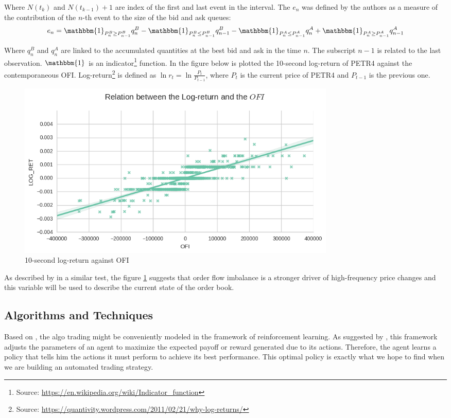\documentclass[a4paper]{article}
\begin{document}
Where $N(t_k)$ and $N(t_{k-1}) + 1$ are index of the first and last event in the interval. The $e_n$ was defined by the authors as a measure of the contribution of the $n$-th event to the size of the bid and ask queues:
$$e_n = \mathbbm{1}_{P_{n}^{B} \geq P_{n-1}^{B}} q^{B}_{n} - \mathbbm{1}_{P_{n}^{B} \leq P_{n-1}^{B}}  q^{B}_{n-1} - \mathbbm{1}_{P_{n}^{A} \leq P_{n-1}^{A}} q^{A}_{n} + \mathbbm{1}_{P_{n}^{A} \geq P_{n-1}^{A}}  q^{A}_{n-1}$$

Where $q^{B}_{n}$ and $q^{A}_{n}$ are linked to the accumulated quantities at the best bid and ask in the time $n$. The subscript $n-1$ is related to the last observation. $\mathbbm{1}$ is an indicator\footnote{Source: \url{https://en.wikipedia.org/wiki/Indicator_function}} function. In the figure below is plotted the 10-second log-return of PETR4 against the contemporaneous OFI.  Log-return\footnote{Source: \url{https://quantivity.wordpress.com/2011/02/21/why-log-returns/}} is defined as $\ln{r_t} = \ln{\frac{P_t}{P_{t-1}}}$, where $P_t$ is the current price of PETR4 and $P_{t-1}$ is the previous one.

\begin{figure}[ht!]
\centering
\includegraphics[width=0.75\textwidth]{figures/ofi_logret.png}
\caption{\label{fig:ofi_linear}10-second log-return against OFI}
\end{figure}

As described by \cite{cont2014price} in a similar test, the figure \ref{fig:ofi_linear} suggests that order flow imbalance is a stronger driver of high-frequency price changes and this variable will be used to describe the current state of the order book.

\subsection{Algorithms and Techniques}
Based on \cite{cont2014price}, the algo trading might be conveniently modeled in the framework of reinforcement learning. As suggested by \cite{du1algorithm}, this framework adjusts the parameters of an agent to maximize the expected payoff or reward generated due to its actions. Therefore, the agent learns a policy that tells him the actions it must perform to achieve its best performance. This optimal policy is exactly what we hope to find when we are building an automated trading strategy.
\end{document}
